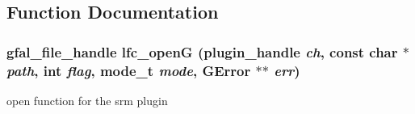 \subsection{Function Documentation}
\subsubsection{\setlength{\rightskip}{0pt plus 5cm}gfal\_\-file\_\-handle lfc\_\-open\-G (plugin\_\-handle {\em ch}, const char $\ast$ {\em path}, int {\em flag}, mode\_\-t {\em mode}, GError $\ast$$\ast$ {\em err})}\label{gfal__common__lfc__open_8c_a1205fd03e80a4145a8aba41eb279652}


open function for the srm plugin 